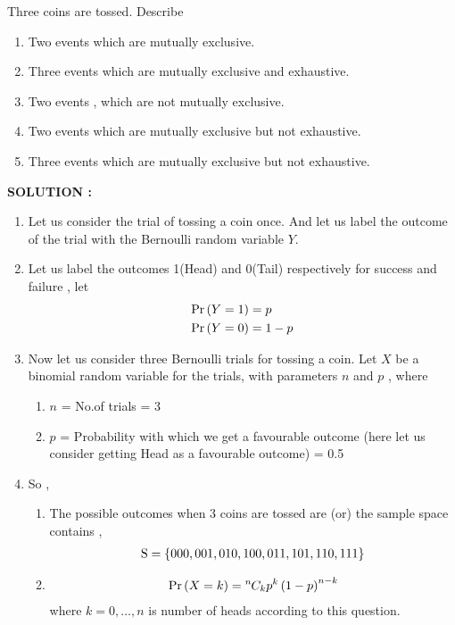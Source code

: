\documentclass[journal,12pt,twocolumn]{IEEEtran}
\begin{document}
Three coins are tossed. Describe 
\begin{enumerate}[label=(\roman{enumi})]
    \item Two events which are mutually exclusive.
    \item Three events which are mutually exclusive and exhaustive.
    \item Two events , which are not mutually exclusive.
    \item Two events which are mutually exclusive but not exhaustive.
    \item Three events which are mutually exclusive but not exhaustive.
\end{enumerate}

\textbf{SOLUTION :}

\begin{enumerate}
    \item Let us consider the trial of tossing a coin once. And let us label the outcome of the trial with the Bernoulli random variable $Y$.
    \item Let us label the outcomes 1(Head) and 0(Tail) respectively for success and failure , let
	    \begin{align}
		\Pr\left(Y=1\right) &= p \\
		\Pr\left(Y=0\right) &= 1-p
	    \end{align}
    \item Now let us consider three Bernoulli trials for tossing a coin. Let $X$ be a binomial random variable for the trials, with parameters $n$ and $p$ , where
	    \begin{enumerate}
		\item $n$ = No.of trials = 3
		\item $p$ = Probability with which we get a favourable outcome (here let us consider getting Head as a favourable outcome) = 0.5
	    \end{enumerate}
    \item So ,
	    \begin{enumerate}
		\item The possible outcomes when 3 coins are tossed are (or) the sample space contains ,
			\begin{align}
			    \text{S} = \left\{000,001,010,100,011,101,110,111\right\}
			\end{align}
		\item 
			\begin{align}
			    \Pr\left(X = k\right) = {{}^{n}\mkern-1muC_{k}} p^k\left(1-p\right)^{n-k}
			\end{align}
			where $k= 0,\dots, n$ is number of heads according to this question.
	    \end{enumerate}
\end{enumerate}
\end{document}
